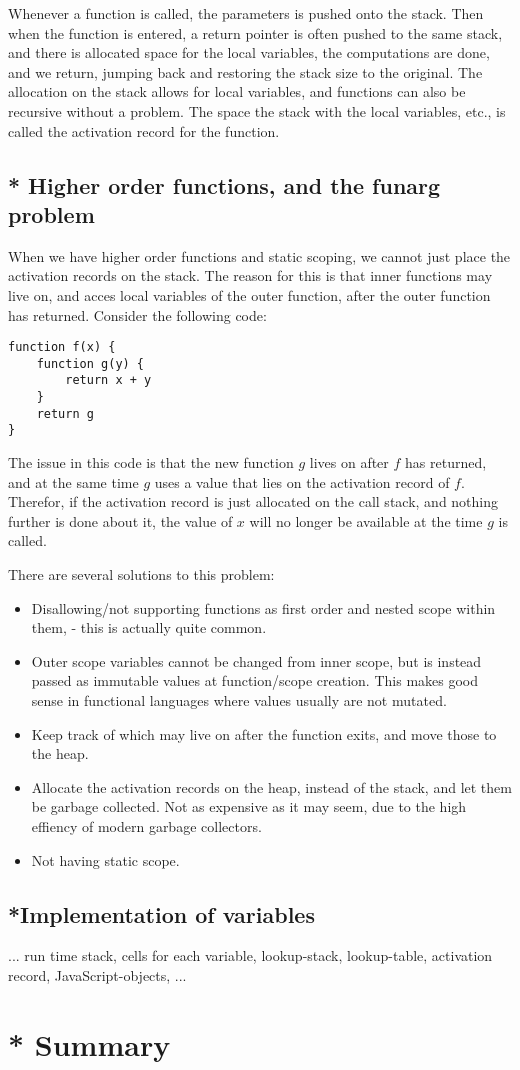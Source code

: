 Whenever a function is called, the parameters is pushed onto the stack. Then when the function is entered, a return pointer is often pushed to the same stack, and there is allocated space for the local variables, the computations are done, and we return, jumping back and restoring the stack size to the original.
The allocation on the stack allows for local variables, and functions can also be recursive without a problem. The space the stack with the local variables, etc., is called the activation record for the function.

\subsection{* Higher order functions, and the funarg problem}
\label{funarg}

When we have higher order functions and static scoping, we cannot just place the activation records on the stack. The reason for this is that inner functions may live on, and acces local variables of the outer function, after the outer function has returned. Consider the following code:
\begin{verbatim}
function f(x) {
    function g(y) {
        return x + y
    }
    return g
}
\end{verbatim}

The issue in this code is that the new function $g$ lives on after $f$ has returned, and at the same time $g$ uses a value that lies on the activation record of $f$. Therefor, if the activation record is just allocated on the call stack, and nothing further is done about it, the value of $x$ will no longer be available at the time $g$ is called.

There are several solutions to this problem:
\begin{itemize}
\item Disallowing/not supporting functions as first order and nested scope within them, - this is actually quite common.
\item Outer scope variables cannot be changed from inner scope, but is instead passed as immutable values at function/scope creation. This makes good sense in functional languages where values usually are not mutated.
\item Keep track of which may live on after the function exits, and move those to the heap.
\item Allocate the activation records on the heap, instead of the stack, and let them be garbage collected. Not as expensive as it may seem, due to the high effiency of modern garbage collectors.
\item Not having static scope.
\end{itemize}

\subsection{*Implementation of variables}
... run time stack, cells for each variable, lookup-stack, lookup-table, activation record, JavaScript-objects, ...




\section{* Summary}
